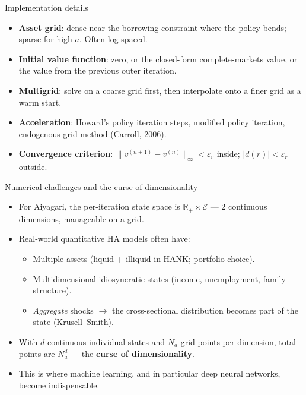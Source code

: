 \documentclass[10pt,english,aspectratio=169]{beamer}
\begin{document}
\begin{frame}{Implementation details}
\begin{itemize}
\item \textbf{Asset grid}: dense near the borrowing constraint where the policy bends; sparse for high $a$. Often log-spaced.
\medskip
\item \textbf{Initial value function}: zero, or the closed-form complete-markets value, or the value from the previous outer iteration.
\medskip
\item \textbf{Multigrid}: solve on a coarse grid first, then interpolate onto a finer grid as a warm start.
\medskip
\item \textbf{Acceleration}: Howard's policy iteration steps, modified policy iteration, endogenous grid method (Carroll, 2006).
\medskip
\item \textbf{Convergence criterion}: $\|v^{(n+1)} - v^{(n)}\|_\infty < \varepsilon_v$ inside; $|d(r)| < \varepsilon_r$ outside.
\end{itemize}
\end{frame}

\begin{frame}{Numerical challenges and the curse of dimensionality}
\begin{itemize}
\item For Aiyagari, the per-iteration state space is $\mathbb{R}_+ \times \mathcal{E}$ --- 2 continuous dimensions, manageable on a grid.
\medskip
\item Real-world quantitative HA models often have:
  \begin{itemize}
  \item Multiple assets (liquid + illiquid in HANK; portfolio choice).
  \item Multidimensional idiosyncratic states (income, unemployment, family structure).
  \item \emph{Aggregate} shocks $\to$ the cross-sectional distribution becomes part of the state (Krusell--Smith).
  \end{itemize}
\medskip
\item With $d$ continuous individual states and $N_a$ grid points per dimension, total points are $N_a^d$ --- the \textbf{curse of dimensionality}.
\medskip
\item This is where machine learning, and in particular deep neural networks, become indispensable.
\end{itemize}
\end{frame}

\end{document}
